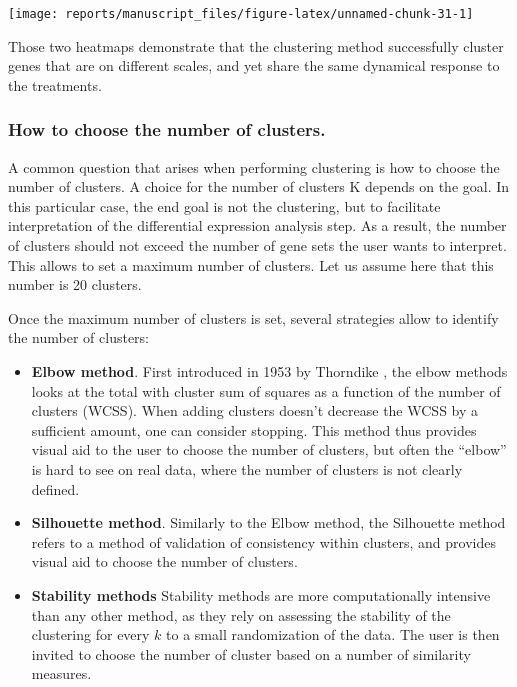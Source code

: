 \documentclass[9pt,a4paper,]{extarticle}
\begin{document}
\begin{center}\texttt{[image: reports/manuscript\_files/figure-latex/unnamed-chunk-31-1]} \end{center}

Those two heatmaps demonstrate that the clustering method successfully cluster
genes that are on different scales, and yet share the same dynamical response
to the treatments.

\hypertarget{how-to-choose-the-number-of-clusters.}{%
\subsubsection{How to choose the number of clusters.}\label{how-to-choose-the-number-of-clusters.}}

A common question that arises when performing clustering is how to choose the
number of clusters. A choice for the number of clusters K depends on the goal.
In this particular case, the end goal is not the clustering, but to facilitate
interpretation of the differential expression analysis step. As a result, the
number of clusters should not exceed the number of gene sets the user wants to
interpret. This allows to set a maximum number of clusters. Let us assume here
that this number is 20 clusters.

Once the maximum number of clusters is set, several strategies allow to
identify the number of clusters:

\begin{itemize}
\tightlist
\item
  \textbf{Elbow method}. First introduced in 1953 by Thorndike \citep{thorndike:who},
  the elbow methods looks at the total with cluster sum of squares
  as a function of the number of clusters (WCSS). When adding clusters
  doesn't decrease the WCSS by a sufficient
  amount, one can consider stopping. This method thus provides visual aid to
  the user to choose the number of clusters, but often the ``elbow'' is hard to
  see on real data, where the number of clusters is not clearly defined.
\item
  \textbf{Silhouette method}. Similarly to the Elbow method, the Silhouette method
  refers to a method of validation of consistency within clusters, and
  provides visual aid to choose the number of clusters.
\item
  \textbf{Stability methods} Stability methods are more computationally intensive
  than any other method, as they rely on assessing the stability of the
  clustering for every \(k\) to a small randomization of the data. The user is
  then invited to choose the number of cluster based on a number of similarity
  measures.
\end{itemize}
\end{document}
